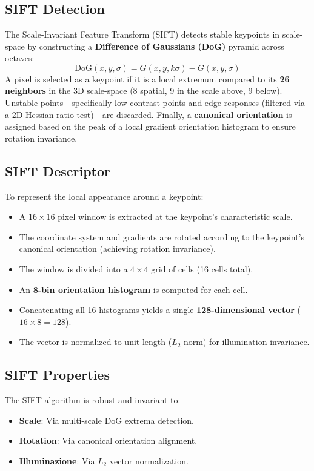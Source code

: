 
\section[Question -- {\it SIFT Algorithm}]{}

\subsection{SIFT Detection}
The Scale-Invariant Feature Transform (SIFT) detects stable keypoints in scale-space by constructing a \textbf{Difference of Gaussians (DoG)} pyramid across octaves:
\[
  \mathrm{DoG}(x, y, \sigma) = G(x, y, k\sigma) - G(x, y, \sigma)
\]
A pixel is selected as a keypoint if it is a local extremum compared to its \textbf{26 neighbors} in the 3D scale-space (8 spatial, 9 in the scale above, 9 below). 
Unstable points—specifically low-contrast points and edge responses (filtered via a 2D Hessian ratio test)—are discarded. 
Finally, a \textbf{canonical orientation} is assigned based on the peak of a local gradient orientation histogram to ensure rotation invariance.

\subsection{SIFT Descriptor}
To represent the local appearance around a keypoint:
\begin{itemize}
    \item A $16 \times 16$ pixel window is extracted at the keypoint's characteristic scale.
    \item The coordinate system and gradients are rotated according to the keypoint's canonical orientation (achieving rotation invariance).
    \item The window is divided into a $4 \times 4$ grid of cells (16 cells total).
    \item An \textbf{8-bin orientation histogram} is computed for each cell.
    \item Concatenating all 16 histograms yields a single \textbf{128-dimensional vector} ($16 \times 8 = 128$).
    \item The vector is normalized to unit length ($L_2$ norm) for illumination invariance.
\end{itemize}

\subsection{SIFT Properties}
The SIFT algorithm is robust and invariant to:
\begin{itemize}
    \item \textbf{Scale}: Via multi-scale DoG extrema detection.
    \item \textbf{Rotation}: Via canonical orientation alignment.
    \item \textbf{Illuminazione}: Via $L_2$ vector normalization.
\end{itemize}